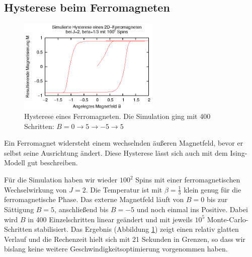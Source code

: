 \subsection{Hysterese beim Ferromagneten}
\begin{figure}
  \includegraphics[width=0.6\textwidth]{bilder/hysterese/hysterese.eps}
  \caption{Hysterese eines Ferromagneten. Die Simulation ging mit 400 Schritten: $B=0\to 5 \to -5 \to 5$\label{hysterese}}
\end{figure}
Ein Ferromagnet widersteht einem wechselnden äußeren Magnetfeld, bevor er selbst seine Ausrichtung ändert.
Diese Hysterese lässt sich auch mit dem Ising-Modell gut beschreiben.

Für die Simulation haben wir wieder $100^2$ Spins mit einer ferromagnetischen Wechselwirkung von $J=2$.
Die Temperatur ist mit $\beta=\frac 13$ klein genug für die ferromagnetische Phase.
Das externe Magnetfeld läuft von $B=0$ bis zur Sättigung $B=5$, anschließend bis $B=-5$ und noch einmal ins Positive.
Dabei wird $B$ in 400 Einzelschritten linear geändert und mit jeweils $10^5$ Monte-Carlo-Schritten stabilisiert.
Das Ergebnis (Abbildung \ref{hysterese}) zeigt einen relativ glatten Verlauf und die Rechenzeit hielt sich mit 21 Sekunden in Grenzen, so dass wir bislang keine weitere Geschwindigkeitsoptimierung vorgenommen haben.


